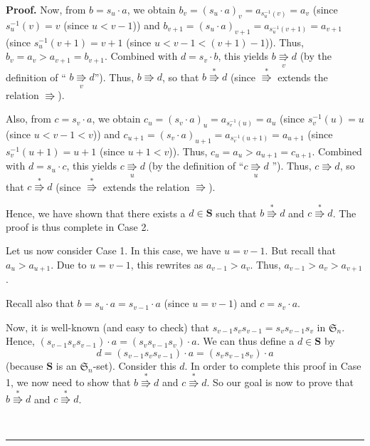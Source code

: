\documentclass[numbers=enddot,12pt,final,onecolumn,notitlepage]{scrartcl}%
\theoremstyle{definition}
\newenvironment{proof}[1][Proof]{\noindent\textbf{#1.} }{\ \rule{0.5em}{0.5em}}
\newenvironment{verlong}{}{}
\begin{document}
\begin{proof}
\begin{verlong}
Now, from $b=s_{u}\cdot a$, we obtain $b_{v}=\left(  s_{u}\cdot a\right)
_{v}=a_{s_{u}^{-1}\left(  v\right)  }=a_{v}$ (since $s_{u}^{-1}\left(
v\right)  =v$ (since $u<v-1$)) and $b_{v+1}=\left(  s_{u}\cdot a\right)
_{v+1}=a_{s_{u}^{-1}\left(  v+1\right)  }=a_{v+1}$ (since $s_{u}^{-1}\left(
v+1\right)  =v+1$ (since $u<v-1<\left(  v+1\right)  -1$)). Thus, $b_{v}%
=a_{v}>a_{v+1}=b_{v+1}$. Combined with $d=s_{v}\cdot b$, this yields
$b\underset{v}{\Rrightarrow}d$ (by the definition of \textquotedblleft%
$b\underset{v}{\Rrightarrow}d$\textquotedblright). Thus, $b\Rrightarrow d$, so
that $b\overset{\ast}{\Rrightarrow}d$ (since $\overset{\ast}{\Rrightarrow}$
extends the relation $\Rrightarrow$).

Also, from $c=s_{v}\cdot a$, we obtain $c_{u}=\left(  s_{v}\cdot a\right)
_{u}=a_{s_{v}^{-1}\left(  u\right)  }=a_{u}$ (since $s_{v}^{-1}\left(
u\right)  =u$ (since $u<v-1<v$)) and $c_{u+1}=\left(  s_{v}\cdot a\right)
_{u+1}=a_{s_{v}^{-1}\left(  u+1\right)  }=a_{u+1}$ (since $s_{v}^{-1}\left(
u+1\right)  =u+1$ (since $u+1<v$)). Thus, $c_{u}=a_{u}>a_{u+1}=c_{u+1}$.
Combined with $d=s_{u}\cdot c$, this yields $c\underset{u}{\Rrightarrow}d$ (by
the definition of \textquotedblleft$c\underset{u}{\Rrightarrow}d$%
\textquotedblright). Thus, $c\Rrightarrow d$, so that $c\overset{\ast
}{\Rrightarrow}d$ (since $\overset{\ast}{\Rrightarrow}$ extends the relation
$\Rrightarrow$).

Hence, we have shown that there exists a $d\in\mathbf{S}$ such that
$b\overset{\ast}{\Rrightarrow}d$ and $c\overset{\ast}{\Rrightarrow}d$. The
proof is thus complete in Case 2.

Let us now consider Case 1. In this case, we have $u=v-1$. But recall that
$a_{u}>a_{u+1}$. Due to $u=v-1$, this rewrites as $a_{v-1}>a_{v}$. Thus,
$a_{v-1}>a_{v}>a_{v+1}$.

Recall also that $b=s_{u}\cdot a=s_{v-1}\cdot a$ (since $u=v-1$) and
$c=s_{v}\cdot a$.

Now, it is well-known (and easy to check) that $s_{v-1}s_{v}s_{v-1}%
=s_{v}s_{v-1}s_{v}$ in $\mathfrak{S}_{n}$. Hence,
$\left(  s_{v-1}s_{v}s_{v-1}\right)  \cdot a=\left(  s_{v}s_{v-1}%
s_{v}\right)  \cdot a$. We can thus define a $d\in
\mathbf{S}$ by%
\[
d=\left(  s_{v-1}s_{v}s_{v-1}\right)  \cdot a=\left(  s_{v}s_{v-1}%
s_{v}\right)  \cdot a
\]
(because $\mathbf{S}$ is an $\mathfrak{S}_{n}$-set). Consider this $d$. In
order to complete this proof in Case 1, we now need to show that
$b\overset{\ast}{\Rrightarrow}d$ and $c\overset{\ast}{\Rrightarrow}d$. So our
goal is now to prove that $b\overset{\ast}{\Rrightarrow}d$ and $c\overset{\ast
}{\Rrightarrow}d$.


\end{verlong}
\end{proof}
\end{document}
